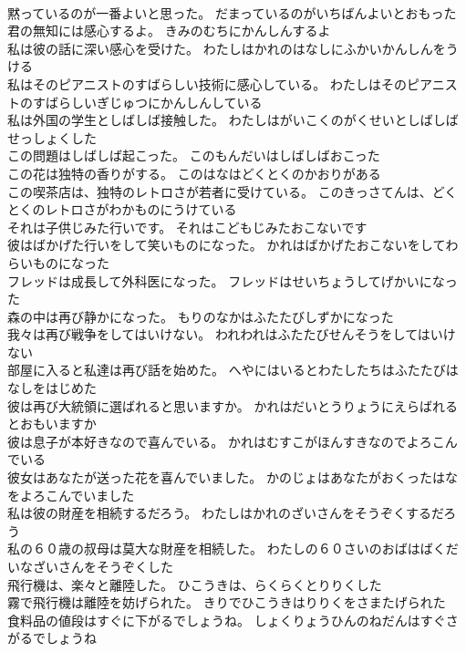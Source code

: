 \documentclass[8pt]{extreport}
\begin{document}
\begin{CJK}{UTF8}{min}
\\	黙っているのが一番よいと思った。	だまっているのがいちばんよいとおもった 
\\	君の無知には感心するよ。	きみのむちにかんしんするよ 
\\	私は彼の話に深い感心を受けた。	わたしはかれのはなしにふかいかんしんをうける 
\\	私はそのピアニストのすばらしい技術に感心している。	わたしはそのピアニストのすばらしいぎじゅつにかんしんしている 
\\	私は外国の学生としばしば接触した。	わたしはがいこくのがくせいとしばしばせっしょくした 
\\	この問題はしばしば起こった。	このもんだいはしばしばおこった 
\\	この花は独特の香りがする。	このはなはどくとくのかおりがある 
\\	この喫茶店は、独特のレトロさが若者に受けている。	このきっさてんは、どくとくのレトロさがわかものにうけている 
\\	それは子供じみた行いです。	それはこどもじみたおこないです 
\\	彼はばかげた行いをして笑いものになった。	かれはばかげたおこないをしてわらいものになった 
\\	フレッドは成長して外科医になった。	フレッドはせいちょうしてげかいになった 
\\	森の中は再び静かになった。	もりのなかはふたたびしずかになった 
\\	我々は再び戦争をしてはいけない。	われわれはふたたびせんそうをしてはいけない 
\\	部屋に入ると私達は再び話を始めた。	へやにはいるとわたしたちはふたたびはなしをはじめた 
\\	彼は再び大統領に選ばれると思いますか。	かれはだいとうりょうにえらばれるとおもいますか 
\\	彼は息子が本好きなので喜んでいる。	かれはむすこがほんすきなのでよろこんでいる 
\\	彼女はあなたが送った花を喜んでいました。	かのじょはあなたがおくったはなをよろこんでいました 
\\	私は彼の財産を相続するだろう。	わたしはかれのざいさんをそうぞくするだろう 
\\	私の６０歳の叔母は莫大な財産を相続した。	わたしの６０さいのおばはばくだいなざいさんをそうぞくした 
\\	飛行機は、楽々と離陸した。	ひこうきは、らくらくとりりくした 
\\	霧で飛行機は離陸を妨げられた。	きりでひこうきはりりくをさまたげられた 
\\	食料品の値段はすぐに下がるでしょうね。	しょくりょうひんのねだんはすぐさがるでしょうね 

\end{CJK}
\end{document}
